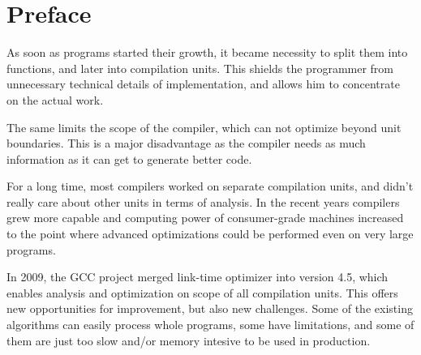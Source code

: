 \chapter*{Preface}

%
%
%
%

As soon as programs started their growth, it became necessity to split them into
functions, and later into compilation units. This shields the programmer from
unnecessary technical details of implementation, and allows him to concentrate on
the actual work.

The same limits the scope of the compiler, which can not optimize beyond unit
boundaries.  This is a major disadvantage as the compiler needs as much
information as it can get to generate better code.

For a long time, most compilers worked on separate compilation units, and didn't
really care about other units in terms of analysis.  In the recent years
compilers grew more capable and computing power of consumer-grade machines
increased to the point where advanced optimizations could be performed even on
very large programs.

In 2009, the GCC project merged link-time optimizer into version 4.5, which enables
analysis and optimization on scope of all compilation units. This offers new
opportunities for improvement, but also new challenges. Some of the existing
algorithms can easily process whole programs, some have limitations, and some
of them are just too slow and/or memory intesive to be used in production.

